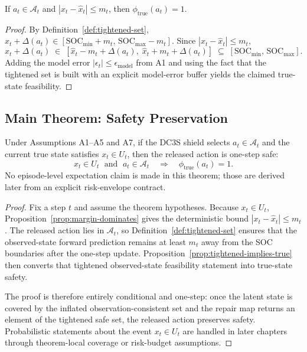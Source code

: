 \begin{proposition}
\label{prop:tightened-implies-true}
If $a_t \in \mathcal{A}_t$ and $|x_t - \hat{x}_t| \le m_t$, then
$\phi_{\text{true}}(a_t) = 1$.
\end{proposition}

\begin{proof}
By Definition~\ref{def:tightened-set},
$\hat{x}_t + \Delta(a_t) \in [\text{SOC}_{\min} + m_t,\,
\text{SOC}_{\max} - m_t]$.  Since $|x_t - \hat{x}_t| \le m_t$,
\[
  x_t + \Delta(a_t) \;\in\;
  [\hat{x}_t - m_t + \Delta(a_t),\; \hat{x}_t + m_t + \Delta(a_t)]
  \;\subseteq\; [\text{SOC}_{\min},\, \text{SOC}_{\max}].
\]
Adding the model error $|\epsilon_t| \le \epsilon_{\text{model}}$ from A1 and
using the fact that the tightened set is built with an explicit model-error
buffer yields the claimed true-state feasibility.
\end{proof}

\subsection{Main Theorem: Safety Preservation}

\begin{theorem}
\label{thm:safety-preservation}
Under Assumptions A1--A5 and A7, if the DC3S shield selects
$a_t \in \mathcal{A}_t$ and the current true state satisfies
$x_t \in U_t$, then the released action is one-step safe:
\[
  x_t \in U_t \;\text{ and }\; a_t \in \mathcal{A}_t
  \quad\Longrightarrow\quad
  \phi_{\text{true}}(a_t) = 1.
\]
No episode-level expectation claim is made in this theorem; those are derived
later from an explicit risk-envelope contract.
\end{theorem}

\begin{proof}
Fix a step $t$ and assume the theorem hypotheses.  Because $x_t \in U_t$,
Proposition~\ref{prop:margin-dominates} gives the deterministic bound
$|x_t-\hat{x}_t| \le m_t$.  The released action lies in $\mathcal{A}_t$, so
Definition~\ref{def:tightened-set} ensures that the observed-state forward
prediction remains at least $m_t$ away from the SOC boundaries after the
one-step update.  Proposition~\ref{prop:tightened-implies-true} then converts
that tightened observed-state feasibility statement into true-state safety.

The proof is therefore entirely conditional and one-step: once the latent
state is covered by the inflated observation-consistent set and the repair map
returns an element of the tightened safe set, the released action preserves
safety.  Probabilistic statements about the event $x_t \in U_t$ are handled in
later chapters through theorem-local coverage or risk-budget assumptions.
\end{proof}

